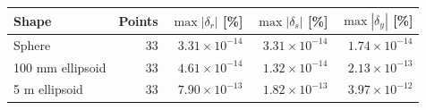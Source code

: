 \begin{tabular}{lrrrr}
\toprule
Shape & Points & $\max|\delta_r|$ [\%] & $\max|\delta_s|$ [\%] & $\max|\delta_y|$ [\%] \\
\midrule
Sphere & 33 & $3.31\times10^{-14}$ & $3.31\times10^{-14}$ & $1.74\times10^{-14}$ \\
100 mm ellipsoid & 33 & $4.61\times10^{-14}$ & $1.32\times10^{-14}$ & $2.13\times10^{-13}$ \\
5 m ellipsoid & 33 & $7.90\times10^{-13}$ & $1.82\times10^{-13}$ & $3.97\times10^{-12}$ \\
\bottomrule
\end{tabular}
